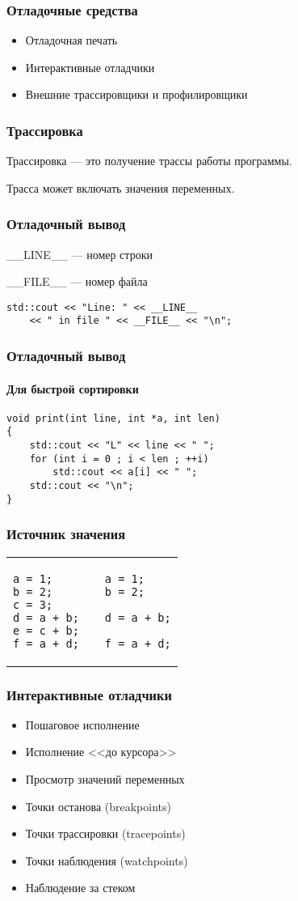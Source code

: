 \documentclass{beamer}
\begin{document}
\begin{frame}
  \frametitle{Отладочные средства}
  \begin{itemize}[<+->]
    \item Отладочная печать
    \item Интерактивные отладчики
    \item Внешние трассировщики и профилировщики
  \end{itemize}
\end{frame}

\begin{frame}
  \frametitle{Трассировка}
  Трассировка --- это получение трассы работы программы.
  
  Трасса может включать значения переменных.
\end{frame}

\begin{frame}[fragile]
  \frametitle{Отладочный вывод}
  \_\_LINE\_\_ --- номер строки
  
  \_\_FILE\_\_ --- номер файла
\begin{lstlisting}
std::cout << "Line: " << __LINE__
    << " in file " << __FILE__ << "\n";
\end{lstlisting}
\end{frame}

\begin{frame}[fragile]
  \frametitle{Отладочный вывод}
  \framesubtitle{Для быстрой сортировки}
\begin{lstlisting}
void print(int line, int *a, int len)
{
    std::cout << "L" << line << " ";
    for (int i = 0 ; i < len ; ++i)
        std::cout << a[i] << " ";
    std::cout << "\n";
}
\end{lstlisting}
\end{frame}

\begin{frame}[fragile]
  \frametitle{Источник значения}
  \begin{tabular}{lp{2cm}l}
  \begin{lstlisting}
a = 1;
b = 2;
c = 3;
d = a + b;
e = c + b;
f = a + d;
  \end{lstlisting}
  & &
  \begin{lstlisting}
a = 1;
b = 2;

d = a + b;

f = a + d;
  \end{lstlisting}
  \\
  \end{tabular}
\end{frame}

\begin{frame}
  \frametitle{Интерактивные отладчики}
\begin{itemize}
\item Пошаговое исполнение
\item Исполнение <<до курсора>>
\item Просмотр значений переменных
\item Точки останова (breakpoints)
\item Точки трассировки (tracepoints)
\item Точки наблюдения (watchpoints)
\item Наблюдение за стеком
\end{itemize}
\end{frame}
\end{document}
